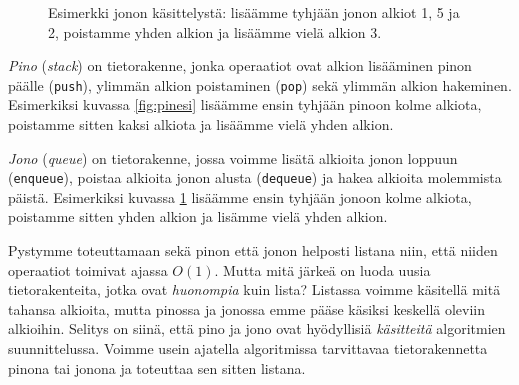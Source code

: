 \begin{figure}
\center
{}
\caption{Esimerkki jonon käsittelystä:
lisäämme tyhjään jonon alkiot 1, 5 ja 2,
poistamme yhden alkion ja lisäämme vielä alkion 3.}
\label{fig:jonesi}
\end{figure}


\emph{Pino} (\emph{stack}) on tietorakenne,
jonka operaatiot ovat
alkion lisääminen pinon päälle (\texttt{push}),
ylimmän alkion poistaminen (\texttt{pop})
sekä ylimmän alkion hakeminen.
Esimerkiksi kuvassa \ref{fig:pinesi} lisäämme ensin tyhjään pinoon kolme alkiota,
poistamme sitten kaksi alkiota ja lisäämme vielä yhden alkion.


\emph{Jono} (\emph{queue}) on tietorakenne, jossa voimme lisätä alkioita
jonon loppuun (\texttt{enqueue}),
poistaa alkioita jonon alusta (\texttt{dequeue})
ja hakea alkioita molemmista päistä.
Esimerkiksi kuvassa \ref{fig:jonesi} lisäämme ensin tyhjään jonoon
kolme alkiota, poistamme sitten yhden alkion ja lisämme vielä yhden alkion.

Pystymme toteuttamaan sekä pinon että jonon helposti
listana niin, että niiden operaatiot toimivat ajassa $O(1)$.
Mutta mitä järkeä on luoda uusia tietorakenteita,
jotka ovat \emph{huonompia} kuin lista?
Listassa voimme käsitellä mitä tahansa alkioita, mutta
pinossa ja jonossa emme pääse käsiksi keskellä oleviin alkioihin.
Selitys on siinä, että pino ja jono ovat hyödyllisiä 
\emph{käsit\-teitä} algoritmien suunnittelussa.
Voimme usein ajatella algoritmissa tarvittavaa
tietorakennetta pinona tai jonona ja toteuttaa sen sitten listana.

